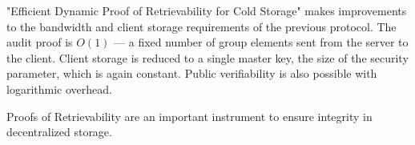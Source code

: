 "Efficient Dynamic Proof of Retrievability for Cold Storage" makes improvements to the bandwidth and
client storage requirements of the previous protocol.
The audit proof is $O(1)$ --- a fixed number of group elements sent from the server to the client.
Client storage is reduced to a single master key, the size of the security parameter,
which is again constant.
Public verifiability is also possible with logarithmic overhead.

Proofs of Retrievability are an important instrument to ensure integrity in decentralized storage.
